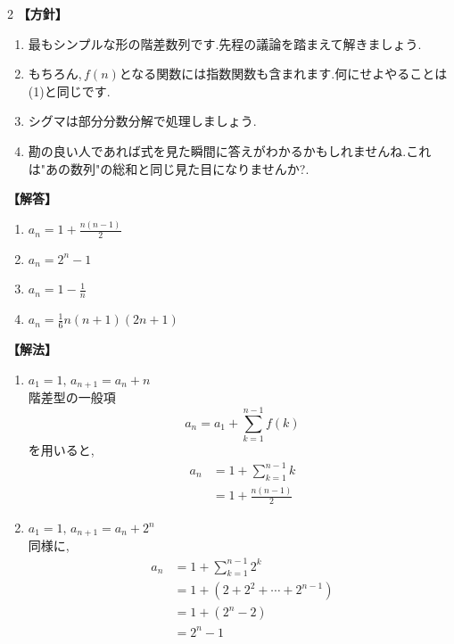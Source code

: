 \documentclass[dvipdfmx,a4paper,11pt,fleqn,openany]{jsbook}
\begin{document}
\begin{multicols*}{2}
      \noindent\textbf{【方針】}
      \begin{enumerate}[label=(\arabic*),parsep=3pt]
        \item 最もシンプルな形の階差数列です.先程の議論を踏まえて解きましょう.
        \item もちろん,\,$f(n)$となる関数には指数関数も含まれます.何にせよやることは\,(1)と同じです.
        \item シグマは部分分数分解で処理しましょう.
        \item 勘の良い人であれば式を見た瞬間に答えがわかるかもしれませんね.これは"あの数列"の総和と同じ見た目になりませんか?.
      \end{enumerate}

      \noindent\textbf{【解答】}
      \begin{enumerate}[label=(\arabic*),parsep=3pt]
        \item $\displaystyle a_n=1+\frac{n(n-1)}{2}$
        \item $\displaystyle a_n=2^n-1$
        \item $\displaystyle a_n=1-\frac{1}{n}$
        \item $\displaystyle a_n=\frac{1}{6}n(n+1)(2n+1)$
      \end{enumerate}

      \noindent\textbf{【解法】}
      \begin{enumerate}[label=(\arabic*),parsep=3pt]
        \item $\displaystyle a_1=1,\,a_{n+1}=a_n+n$\\
              階差型の一般項
              \[
                a_n=a_1+\sum_{k=1}^{n-1}f(k)
              \]
              を用いると,
              \begin{align*}
                a_n
                  &=1+\sum_{k=1}^{n-1}k\\
                  &=1+\frac{n(n-1)}{2}
              \end{align*}

        \item $\displaystyle a_1=1,\,a_{n+1}=a_n+2^n$\\
              同様に,
              \begin{align*}
                a_n
                  &=1+\sum_{k=1}^{n-1}2^k\\
                  &=1+(2+2^2+\cdots+2^{n-1})\\
                  &=1+(2^n-2)\\
                  &=2^n-1
              \end{align*}


\end{enumerate}
\end{multicols*}
\end{document}
